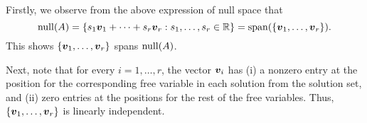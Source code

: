 \begin{enumerate}
\begin{pf}
Firstly, we observe from the above expression of null space that
\[
\operatorname{null}(A)=\{s_1\vb*{v}_1+\dotsb+s_r\vb*{v}_r:s_1,\dotsc,s_r\in\mathbb{R}\}
=\operatorname{span}(\{\vb*{v}_1,\dotsc,\vb*{v}_r\}).
\]
This shows \(\{\vb*{v}_1,\dotsc,\vb*{v}_r\}\) spans \(\operatorname{null}(A)\).

Next, note that for every \(i=1,\dotsc,r\), the vector \(\vb*{v}_i\) has (i) a
nonzero entry at the position for the corresponding free variable in each
solution from the solution set, and (ii) zero entries at the positions for the
rest of the free variables. Thus, \(\{\vb*{v}_1,\dotsc,\vb*{v}_r\}\) is
linearly independent.
\end{pf}
\end{enumerate}
